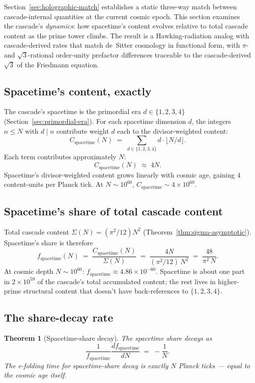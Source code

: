 \documentclass[11pt,a4paper]{article}
\newtheorem{theorem}{Theorem}[section]
\begin{document}
Section~\ref{sec:holographic-match} establishes a static three-way
match between cascade-internal quantities at the current cosmic
epoch. This section examines the cascade's \emph{dynamics}: how
spacetime's content evolves relative to total cascade content as
the prime tower climbs. The result is a Hawking-radiation analog
with cascade-derived rates that match de~Sitter cosmology in
functional form, with $\pi$- and $\sqrt{3}$-rational order-unity
prefactor differences traceable to the cascade-derived $\sqrt{3}$
of the Friedmann equation.

\subsection*{Spacetime's content, exactly}

The cascade's spacetime is the primordial era $d \in \{1, 2, 3, 4\}$
(Section~\ref{sec:primordial-era}). For each spacetime dimension
$d$, the integers $n \leq N$ with $d \mid n$ contribute weight $d$
each to the divisor-weighted content:
\[
C_{\mathrm{spacetime}}(N) \;=\; \sum_{d \in \{1, 2, 3, 4\}} d \cdot \lfloor N/d \rfloor.
\]
Each term contributes approximately $N$:
\[
C_{\mathrm{spacetime}}(N) \;\approx\; 4N.
\]
Spacetime's divisor-weighted content grows linearly with cosmic age,
gaining $4$ content-units per Planck tick. At $N \sim 10^{60}$,
$C_{\mathrm{spacetime}} \sim 4 \times 10^{60}$.

\subsection*{Spacetime's share of total cascade content}

Total cascade content $\Sigma(N) = (\pi^2/12) N^2$
(Theorem~\ref{thm:sigma-asymptotic}). Spacetime's share is therefore
\[
f_{\mathrm{spacetime}}(N) \;=\; \frac{C_{\mathrm{spacetime}}(N)}{\Sigma(N)}
\;=\; \frac{4N}{(\pi^2/12)\, N^2} \;=\; \frac{48}{\pi^2\, N}.
\]
At cosmic depth $N \sim 10^{60}$:
$f_{\mathrm{spacetime}} \approx 4.86 \times 10^{-60}$. Spacetime is
about one part in $2 \times 10^{59}$ of the cascade's total
accumulated content; the rest lives in higher-prime structural
content that doesn't have back-references to $\{1, 2, 3, 4\}$.

\subsection*{The share-decay rate}

\begin{theorem}[Spacetime-share decay]\label{thm:share-decay}
The spacetime share decays as
\[
\frac{1}{f_{\mathrm{spacetime}}} \frac{df_{\mathrm{spacetime}}}{dN}
\;=\; -\frac{1}{N}.
\]
The e-folding time for spacetime-share decay is exactly $N$ Planck
ticks --- equal to the cosmic age itself.
\end{theorem}
\end{document}
